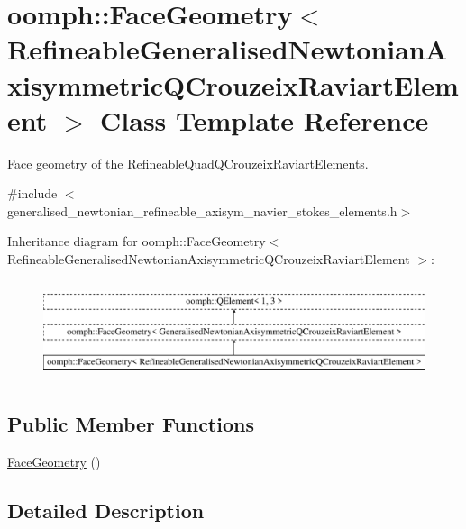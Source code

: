 \hypertarget{classoomph_1_1FaceGeometry_3_01RefineableGeneralisedNewtonianAxisymmetricQCrouzeixRaviartElement_01_4}{}\section{oomph\+:\+:Face\+Geometry$<$ Refineable\+Generalised\+Newtonian\+Axisymmetric\+Q\+Crouzeix\+Raviart\+Element $>$ Class Template Reference}
\label{classoomph_1_1FaceGeometry_3_01RefineableGeneralisedNewtonianAxisymmetricQCrouzeixRaviartElement_01_4}


Face geometry of the Refineable\+Quad\+Q\+Crouzeix\+Raviart\+Elements.  




{\ttfamily \#include $<$generalised\+\_\+newtonian\+\_\+refineable\+\_\+axisym\+\_\+navier\+\_\+stokes\+\_\+elements.\+h$>$}

Inheritance diagram for oomph\+:\+:Face\+Geometry$<$ Refineable\+Generalised\+Newtonian\+Axisymmetric\+Q\+Crouzeix\+Raviart\+Element $>$\+:\begin{figure}[H]
\begin{center}
\leavevmode
\includegraphics[height=2.921739cm]{classoomph_1_1FaceGeometry_3_01RefineableGeneralisedNewtonianAxisymmetricQCrouzeixRaviartElement_01_4}
\end{center}
\end{figure}
\subsection*{Public Member Functions}
\begin{DoxyCompactItemize}
\item 
\hyperlink{classoomph_1_1FaceGeometry_3_01RefineableGeneralisedNewtonianAxisymmetricQCrouzeixRaviartElement_01_4_a2b71d7055924c74769594f0a0d17b407}{Face\+Geometry} ()
\end{DoxyCompactItemize}


\subsection{Detailed Description}
